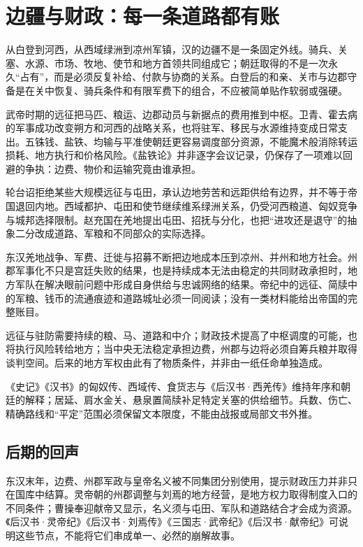 \section{边疆与财政：每一条道路都有账}
\label{sec:synthesis-frontier-fiscal}

从白登到河西，从西域绿洲到凉州军镇，汉的边疆不是一条固定外线。骑兵、关塞、水源、市场、牧地、使节和地方首领共同组成它；朝廷取得的不是一次永久“占有”，而是必须反复补给、付款与协商的关系。白登后的和亲、关市与边郡守备是在关中恢复、骑兵条件和有限军费下的组合，不应被简单贴作软弱或强硬。

武帝时期的远征把马匹、粮运、边郡动员与新据点的费用推到中枢。卫青、霍去病的军事成功改变朔方和河西的战略关系，也将驻军、移民与水源维持变成日常支出。五铢钱、盐铁、均输与平准使朝廷更容易调度部分资源，不能魔术般消除转运损耗、地方执行和价格风险。《盐铁论》并非逐字会议记录，仍保存了一项难以回避的争执：边费、物价和运输究竟由谁承担。

轮台诏拒绝某些大规模远征与屯田，承认边地劳苦和远距供给有边界，并不等于帝国退回内地。西域都护、屯田和使节继续维系绿洲关系，仍受河西粮道、匈奴竞争与城邦选择限制。赵充国在羌地提出屯田、招抚与分化，也把“进攻还是退守”的抽象二分改成道路、军粮和不同部众的实际选择。

东汉羌地战争、军费、迁徙与招募不断把边地成本压到凉州、并州和地方社会。州郡军事化不只是宫廷失败的结果，也是持续成本无法由稳定的共同财政承担时，地方军队在解决眼前问题中形成自身供给与忠诚网络的结果。帝纪中的远征、简牍中的军粮、钱币的流通痕迹和道路城址必须一同阅读；没有一类材料能给出帝国的完整账目。

\begin{causalchain}[从远征到地方军权]
远征与驻防需要持续的粮、马、道路和中介；财政技术提高了中枢调度的可能，也将执行风险转给地方；当中央无法稳定承担边费，州郡与边将必须自筹兵粮并取得谈判空间。后来的地方军权由此有了物质条件，并非由一纸任命单独造成。
\end{causalchain}

\begin{sourcenote}[边防数字和路线]
《史记》《汉书》的匈奴传、西域传、食货志与《后汉书·西羌传》维持年序和朝廷的解释；居延、肩水金关、悬泉置简牍补足特定关塞的供给细节。兵数、伤亡、精确路线和“平定”范围必须保留文本限度，不能由战报或局部文书外推。
\end{sourcenote}
\subsection{后期的回声}

东汉末年，边费、州郡军政与皇帝名义被不同集团分别使用，提示财政压力并非只在国库中结算。灵帝朝的州郡调整与刘焉的地方经营，是地方权力取得制度入口的不同条件；曹操奉迎献帝又显示，名义须与屯田、军队和道路结合才会成为资源。《后汉书·灵帝纪》《后汉书·刘焉传》《三国志·武帝纪》《后汉书·献帝纪》可说明这些节点，不能将它们串成单一、必然的崩解故事。